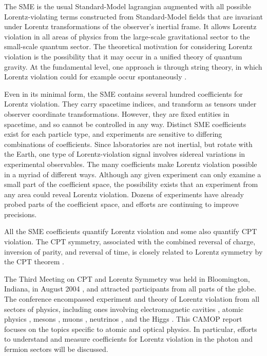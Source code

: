 \documentclass[twocolumn]{revtex4}
\begin{document}
The SME is the usual Standard-Model lagrangian
augmented with all possible Lorentz-violating terms
constructed from Standard-Model fields
that are invariant under Lorentz transformations
of the observer's inertial frame.
It allows Lorentz violation
in all areas of physics
from the large-scale gravitational sector
to the small-scale quantum sector.
The theoretical motivation for
considering Lorentz violation
is the possibility that it may occur
in a unified theory of quantum gravity.
At the fundamental level,
one approach is through string theory,
in which Lorentz violation could for example
occur spontaneously \cite{kps}.

Even in its minimal form,
the SME contains several hundred
coefficients for Lorentz violation.
They carry spacetime indices,
and transform as tensors under observer coordinate transformations.
However,
they are fixed entities in spacetime,
and so cannot be controlled in any way.
Distinct SME coefficients
exist for each particle type,
and experiments are sensitive to
differing combinations of coefficients.
Since laboratories are not inertial,
but rotate with the Earth,
one type of Lorentz-violation signal
involves sidereal variations in experimental observables.
The many coefficients
make Lorentz violation possible in a myriad of different ways.
Although any given experiment
can only examine a small part of the coefficient space,
the possibility exists that an experiment from any area
could reveal Lorentz violation.
Dozens of experiments have already probed parts of the coefficient space,
and efforts are continuing to improve precisions.

All the SME coefficients quantify Lorentz violation
and some also quantify CPT violation.
The CPT symmetry, associated with the combined
reversal of charge, inversion of parity,
and reversal of time,
is closely related to Lorentz symmetry
by the CPT theorem \cite{greenberg}.

The Third Meeting on CPT and Lorentz Symmetry
was held in Bloomington, Indiana, in August 2004 \cite{cpt04},
and attracted participants from all parts of the globe.
The conference encompassed experiment and theory
of Lorentz violation from all sectors of physics,
including ones involving
electromagnetic cavities
\cite{photonth,mewesPRD,carroll,kappa,lipa,muller,wolftobar,qbak},
atomic physics
\cite{hbar,maser,hayano,athena,atrap,penning,penning_UW,
penning_Harvard,altschul,akcl,hunter,romalis,HeNeMaser,boosts neutron,
spaceth, muller2},
mesons \cite{hadronexpt},
muons \cite{muexpt},
neutrinos \cite{nu},
and the Higgs \cite{higgs}.
This CAMOP report focuses on the topics specific to
atomic and optical physics.
In particular,
efforts to understand and measure
coefficients for Lorentz violation in the photon and fermion sectors
will be discussed.
\end{document}
